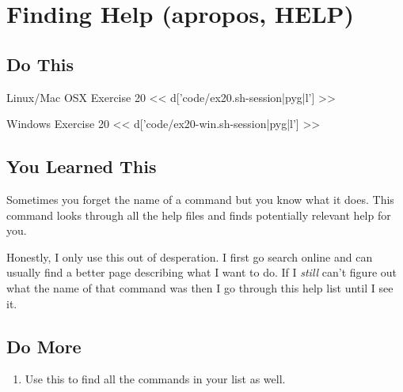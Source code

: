 \chapter{Finding Help (apropos, HELP)}

\section{Do This}

\begin{code}{Linux/Mac OSX Exercise 20}
<< d['code/ex20.sh-session|pyg|l'] >>
\end{code}

\begin{code}{Windows Exercise 20}
<< d['code/ex20-win.sh-session|pyg|l'] >>
\end{code}

\section{You Learned This}

Sometimes you forget the name of a command but you know what it does.  This command
looks through all the help files and finds potentially relevant help for you.

Honestly, I only use this out of desperation.  I first go search online and can
usually find a better page describing what I want to do.  If I \emph{still} can't
figure out what the name of that command was then I go through this help list
until I see it.

\section{Do More}

\begin{enumerate}
\item Use this to find all the commands in your list as well.
\end{enumerate}

